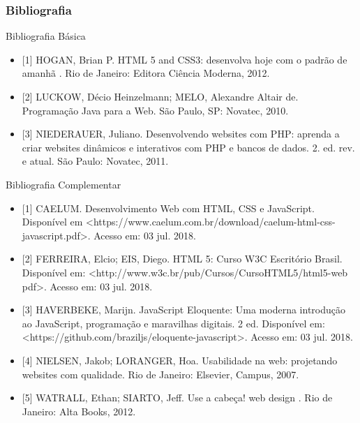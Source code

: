 \documentclass[
	10pt, %
	t, %
]{beamer}
\begin{document}
\begin{frame}
	\frametitle{Bibliografia}

	\begin{block}{Bibliografia Básica}
		\begin{itemize}
			\item {\small [1] HOGAN, Brian P. HTML 5 and CSS3: desenvolva hoje com o padrão de amanhã . Rio de Janeiro: Editora Ciência Moderna, 2012.}
			\item {\small [2] LUCKOW, Décio Heinzelmann; MELO, Alexandre Altair de. Programação Java para a Web. São Paulo, SP: Novatec, 2010.}
			\item {\small [3] NIEDERAUER, Juliano. Desenvolvendo websites com PHP: aprenda a criar websites dinâmicos e interativos com PHP e bancos de dados. 2. ed. rev. e atual. São Paulo: Novatec, 2011.}
		\end{itemize}
	\end{block}

	\begin{block}{Bibliografia Complementar}
		\begin{itemize}
			\item {\small [1] CAELUM. Desenvolvimento Web com HTML, CSS e JavaScript. Disponível em <https://www.caelum.com.br/download/caelum-html-css-javascript.pdf>. Acesso em: 03 jul. 2018.}
			\item {\small [2] FERREIRA, Elcio; EIS, Diego. HTML 5: Curso W3C Escritório Brasil. Disponível em: <http://www.w3c.br/pub/Cursos/CursoHTML5/html5-web pdf>. Acesso em: 03 jul. 2018.}
			\item {\small [3] HAVERBEKE, Marijn. JavaScript Eloquente: Uma moderna introdução ao JavaScript, programação e maravilhas digitais. 2 ed. Disponível em: <https://github.com/braziljs/eloquente-javascript>. Acesso em: 03 jul. 2018.}
			\item {\small [4] NIELSEN, Jakob; LORANGER, Hoa. Usabilidade na web: projetando websites com qualidade. Rio de Janeiro: Elsevier, Campus, 2007.}
			\item {\small [5] WATRALL, Ethan; SIARTO, Jeff. Use a cabeça! web design . Rio de Janeiro: Alta Books, 2012.}
		\end{itemize}
		
	\end{block}

\end{frame}



\end{document}
